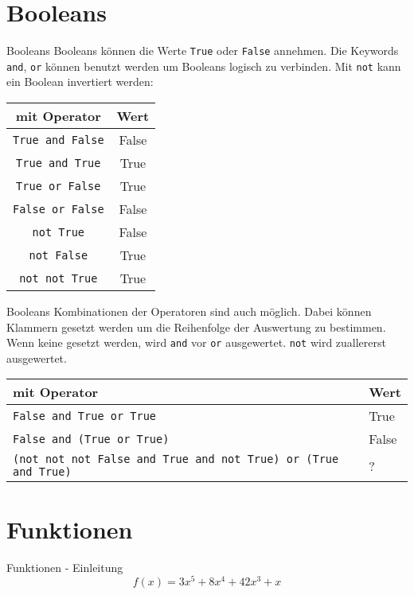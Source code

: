 \section{Booleans}
\begin{frame}{Booleans}
	Booleans können die Werte \alert{\texttt{True}} oder \alert{\texttt{False}} annehmen.
	\linebreak
	Die Keywords \alert{\texttt{and}}, \alert{\texttt{or}} können benutzt werden um Booleans logisch zu verbinden.
	\linebreak
	Mit \alert{\texttt{not}} kann ein Boolean invertiert werden:

	\begin{center}
	\begin{tabular}{c | c}
		\hline\hline
		mit Operator & Wert \\
		\hline\hline
		\texttt{True and False} & False \\
		\texttt{True and True} & True \\
		\texttt{True or False} & True \\
		\texttt{False or False} & False \\
		\hline\hline
		\texttt{not True} & False \\
		\texttt{not False} & True \\
		\texttt{not not True} & True
	\end{tabular}
	\end{center}
\end{frame}

\begin{frame}{Booleans}
	Kombinationen der Operatoren sind auch möglich. Dabei können Klammern gesetzt werden um die Reihenfolge der Auswertung zu bestimmen. Wenn keine gesetzt werden, wird \alert{\texttt{and}} vor \alert{\texttt{or}} ausgewertet. \alert{\texttt{not}} wird zuallererst ausgewertet.
	\begin{center}
		\begin{tabular}{m{8cm} | m{1cm}}
			\hline\hline
			mit Operator & Wert \\
			\hline\hline
			\texttt{False and True or True} & True \\
			\texttt{False and (True or True)} & False \\
			\texttt{(not not not False and True and not True) or (True and True)} & ?
		\end{tabular}
	\end{center}
\end{frame}


\section{Funktionen}
\begin{frame}{Funktionen - Einleitung}
		\Large $$ f(x) = 3x^5 + 8x^4 + 42x^3 + x $$
\end{frame}

